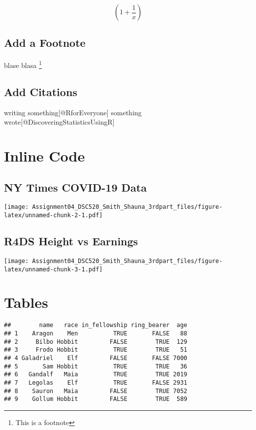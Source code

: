 \documentclass[
]{article}
\begin{document}
\[ (1+\frac{1}{x}) \]

\hypertarget{add-a-footnote}{%
\subsection{Add a Footnote}\label{add-a-footnote}}

blase blasa \footnote{This is a footnote}

\hypertarget{add-citations}{%
\subsection{Add Citations}\label{add-citations}}

writing something{[}@RforEveryone{]} something
wrote{[}@DiscoveringStatisticsUsingR{]}

\hypertarget{inline-code}{%
\section{Inline Code}\label{inline-code}}

\hypertarget{ny-times-covid-19-data}{%
\subsection{NY Times COVID-19 Data}\label{ny-times-covid-19-data}}

\texttt{[image: Assignment04\_DSC520\_Smith\_Shauna\_3rdpart\_files/figure-latex/unnamed-chunk-2-1.pdf]}

\hypertarget{r4ds-height-vs-earnings}{%
\subsection{R4DS Height vs Earnings}\label{r4ds-height-vs-earnings}}

\texttt{[image: Assignment04\_DSC520\_Smith\_Shauna\_3rdpart\_files/figure-latex/unnamed-chunk-3-1.pdf]}

\hypertarget{tables}{%
\section{Tables}\label{tables}}

\begin{verbatim}
##        name   race in_fellowship ring_bearer  age
## 1    Aragon    Men          TRUE       FALSE   88
## 2     Bilbo Hobbit         FALSE        TRUE  129
## 3     Frodo Hobbit          TRUE        TRUE   51
## 4 Galadriel    Elf         FALSE       FALSE 7000
## 5       Sam Hobbit          TRUE        TRUE   36
## 6   Gandalf   Maia          TRUE        TRUE 2019
## 7   Legolas    Elf          TRUE       FALSE 2931
## 8    Sauron   Maia         FALSE        TRUE 7052
## 9    Gollum Hobbit         FALSE        TRUE  589
\end{verbatim}
\end{document}
